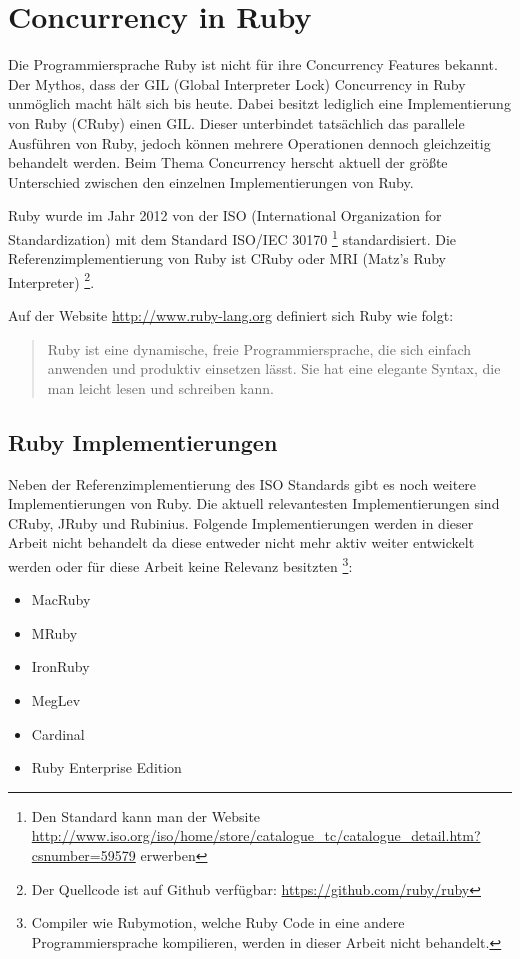\section{Concurrency in Ruby}
\label{section: Ruby}

Die Programmiersprache Ruby ist nicht für ihre Concurrency Features bekannt. Der Mythos, dass der GIL (Global Interpreter Lock) Concurrency in Ruby unmöglich macht hält sich bis heute. Dabei besitzt lediglich eine Implementierung von Ruby (CRuby) einen GIL. Dieser unterbindet tatsächlich das parallele Ausführen von Ruby, jedoch können mehrere Operationen dennoch gleichzeitig behandelt werden. Beim Thema Concurrency herscht aktuell der größte Unterschied zwischen den einzelnen Implementierungen von Ruby.

Ruby wurde im Jahr 2012 von der ISO (International Organization for Standardization) mit dem Standard ISO/IEC 30170 \footnote{Den Standard kann man der Website \url{http://www.iso.org/iso/home/store/catalogue_tc/catalogue_detail.htm?csnumber=59579} erwerben} standardisiert. Die Referenzimplementierung von Ruby ist CRuby oder MRI (Matz's Ruby Interpreter) \footnote{Der Quellcode ist auf Github verfügbar: \url{https://github.com/ruby/ruby}}.

Auf der Website \url{http://www.ruby-lang.org} definiert sich Ruby wie folgt:

\begin{quote}
  Ruby ist eine dynamische, freie Programmiersprache, die sich einfach anwenden und produktiv einsetzen lässt. Sie hat eine elegante Syntax, die man leicht lesen und schreiben kann.
\end{quote}

\subsection{Ruby Implementierungen}

Neben der Referenzimplementierung des ISO Standards gibt es noch weitere Implementierungen von Ruby. Die aktuell relevantesten Implementierungen sind CRuby, JRuby und Rubinius. Folgende Implementierungen werden in dieser Arbeit nicht behandelt da diese entweder nicht mehr aktiv weiter entwickelt werden oder für diese Arbeit keine Relevanz besitzten 
\footnote{Compiler wie Rubymotion, welche Ruby Code in eine andere Programmiersprache kompilieren, werden in dieser Arbeit nicht behandelt.}:

\begin{itemize}
  \item MacRuby
  \item MRuby
  \item IronRuby
  \item MegLev
  \item Cardinal
  \item Ruby Enterprise Edition
\end{itemize}



